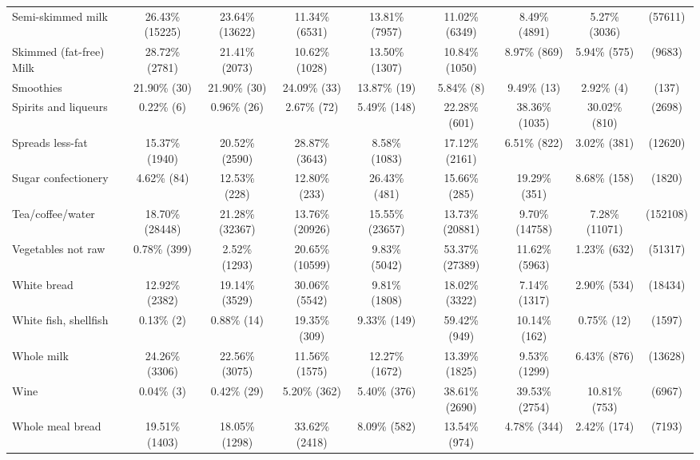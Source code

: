 \documentclass[utf8]{frontiers_suppmat} %
\begin{document}
\begin{table}[]
{\begin{tabular}{@{}lcccccccc@{}}
Semi-skimmed milk         & 26.43\%  (15225) & 23.64\%  (13622) & 11.34\%   (6531) & 13.81\%  (7957) & 11.02\%   (6349) & 8.49\%  (4891)  & 5.27\%  (3036)  &   (57611) \\
Skimmed (fat-free) Milk   & 28.72\%   (2781) & 21.41\%   (2073) & 10.62\%   (1028) & 13.50\%  (1307) & 10.84\%   (1050) & 8.97\%   (869)  & 5.94\%   (575)  &    (9683) \\
Smoothies                 & 21.90\%     (30) & 21.90\%     (30) & 24.09\%     (33) & 13.87\%    (19) & 5.84\%      (8)  & 9.49\%    (13)  & 2.92\%     (4)  &     (137) \\
Spirits and liqueurs      & 0.22\%      (6)  & 0.96\%     (26)  & 2.67\%     (72)  & 5.49\%   (148)  & 22.28\%    (601) & 38.36\%  (1035) & 30.02\%   (810) &    (2698) \\
Spreads less-fat          & 15.37\%   (1940) & 20.52\%   (2590) & 28.87\%   (3643) & 8.58\%  (1083)  & 17.12\%   (2161) & 6.51\%   (822)  & 3.02\%   (381)  &   (12620) \\
Sugar confectionery       & 4.62\%     (84)  & 12.53\%    (228) & 12.80\%    (233) & 26.43\%   (481) & 15.66\%    (285) & 19.29\%   (351) & 8.68\%   (158)  &    (1820) \\
Tea/coffee/water          & 18.70\%  (28448) & 21.28\%  (32367) & 13.76\%  (20926) & 15.55\% (23657) & 13.73\%  (20881) & 9.70\% (14758)  & 7.28\% (11071)  &  (152108) \\
Vegetables not raw        & 0.78\%    (399)  & 2.52\%   (1293)  & 20.65\%  (10599) & 9.83\%  (5042)  & 53.37\%  (27389) & 11.62\%  (5963) & 1.23\%   (632)  &   (51317) \\
White bread               & 12.92\%   (2382) & 19.14\%   (3529) & 30.06\%   (5542) & 9.81\%  (1808)  & 18.02\%   (3322) & 7.14\%  (1317)  & 2.90\%   (534)  &   (18434) \\
White fish, shellfish     & 0.13\%      (2)  & 0.88\%     (14)  & 19.35\%    (309) & 9.33\%   (149)  & 59.42\%    (949) & 10.14\%   (162) & 0.75\%    (12)  &    (1597) \\
Whole milk                & 24.26\%   (3306) & 22.56\%   (3075) & 11.56\%   (1575) & 12.27\%  (1672) & 13.39\%   (1825) & 9.53\%  (1299)  & 6.43\%   (876)  &   (13628) \\
Wine                      & 0.04\%      (3)  & 0.42\%     (29)  & 5.20\%    (362)  & 5.40\%   (376)  & 38.61\%   (2690) & 39.53\%  (2754) & 10.81\%   (753) &    (6967) \\
Whole meal bread          & 19.51\%   (1403) & 18.05\%   (1298) & 33.62\%   (2418) & 8.09\%   (582)  & 13.54\%    (974) & 4.78\%   (344)  & 2.42\%   (174)  &    (7193) \\

\end{tabular}}
\end{table}
\end{document}
